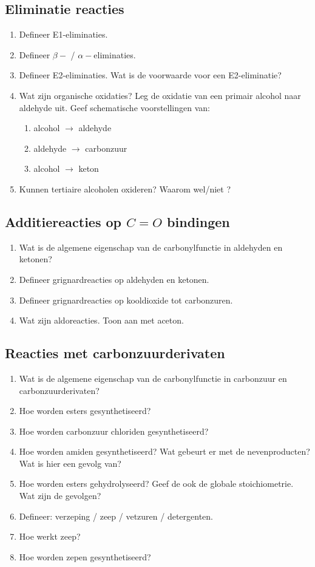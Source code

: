 \documentclass[a4paper,12pt]{article}
\begin{document}
    \subsection*{Eliminatie reacties}
    \begin{enumerate}
        \item Defineer E1-eliminaties.
        \item Defineer $\beta-$ / $\alpha-$eliminaties.
        \item Defineer E2-eliminaties. Wat is de voorwaarde voor een E2-eliminatie?
        \item Wat zijn organische oxidaties? Leg de oxidatie van een primair alcohol naar aldehyde uit. Geef schematische voorstellingen van:
        \begin{enumerate}
            \item alcohol $\rightarrow$ aldehyde
            \item aldehyde $\rightarrow$ carbonzuur
            \item alcohol $\rightarrow$ keton
        \end{enumerate}
        \item Kunnen tertiaire alcoholen oxideren? Waarom wel/niet ?
    \end{enumerate}
    \subsection*{Additiereacties op $C=O$ bindingen}
    \begin{enumerate}
        \item Wat is de algemene eigenschap van de carbonylfunctie in aldehyden en ketonen?
        \item Defineer grignardreacties op aldehyden en ketonen.
        \item Defineer grignardreacties op kooldioxide tot carbonzuren.
        \item Wat zijn aldoreacties. Toon aan met aceton.
    \end{enumerate}
    \subsection*{Reacties met carbonzuurderivaten}
    \begin{enumerate}
        \item Wat is de algemene eigenschap van de carbonylfunctie in carbonzuur en carbonzuurderivaten?
        \item Hoe worden esters gesynthetiseerd?
        \item Hoe worden carbonzuur chloriden gesynthetiseerd?
        \item Hoe worden amiden gesynthetiseerd? Wat gebeurt er met de nevenproducten? Wat is hier een gevolg van?
        \item Hoe worden esters gehydrolyseerd? Geef de ook de globale stoichiometrie. Wat zijn de gevolgen?
        \item Defineer: verzeping / zeep / vetzuren / detergenten.
        \item Hoe werkt zeep?
        \item Hoe worden zepen gesynthetiseerd?
    \end{enumerate}
\end{document}
